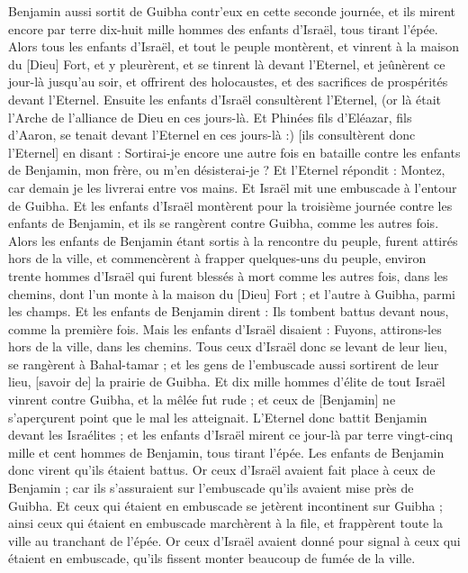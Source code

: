 \begin{multicols}{2}
Benjamin aussi sortit de Guibha contr'eux en cette seconde journée, et ils mirent encore par terre dix-huit mille hommes des enfants d'Israël, tous tirant l'épée.
Alors tous les enfants d'Israël, et tout le peuple montèrent, et vinrent à la maison du [Dieu] Fort, et y pleurèrent, et se tinrent là devant l'Eternel, et jeûnèrent ce jour-là jusqu'au soir, et offrirent des holocaustes, et des sacrifices de prospérités devant l'Eternel.
Ensuite les enfants d'Israël consultèrent l'Eternel, (or là était l'Arche de l'alliance de Dieu en ces jours-là.
Et Phinées fils d'Eléazar, fils d'Aaron, se tenait devant l'Eternel en ces jours-là :) [ils consultèrent donc l'Eternel] en disant : Sortirai-je encore une autre fois en bataille contre les enfants de Benjamin, mon frère, ou m'en désisterai-je ? Et l'Eternel répondit : Montez, car demain je les livrerai entre vos mains.
Et Israël mit une embuscade à l'entour de Guibha.
Et les enfants d'Israël montèrent pour la troisième journée contre les enfants de Benjamin, et ils se rangèrent contre Guibha, comme les autres fois.
Alors les enfants de Benjamin étant sortis à la rencontre du peuple, furent attirés hors de la ville, et commencèrent à frapper quelques-uns du peuple, environ trente hommes d'Israël qui furent blessés à mort comme les autres fois, dans les chemins, dont l'un monte à la maison du [Dieu] Fort ; et l'autre à Guibha, parmi les champs.
Et les enfants de Benjamin dirent : Ils tombent battus devant nous, comme la première fois. Mais les enfants d'Israël disaient : Fuyons, attirons-les hors de la ville, dans les chemins.
Tous ceux d'Israël donc se levant de leur lieu, se rangèrent à Bahal-tamar ; et les gens de l'embuscade aussi sortirent de leur lieu, [savoir de] la prairie de Guibha.
Et dix mille hommes d'élite de tout Israël vinrent contre Guibha, et la mêlée fut rude ; et ceux de [Benjamin] ne s'aperçurent point que le mal les atteignait.
L'Eternel donc battit Benjamin devant les Israélites ; et les enfants d'Israël mirent ce jour-là par terre vingt-cinq mille et cent hommes de Benjamin, tous tirant l'épée.
Les enfants de Benjamin donc virent qu'ils étaient battus. Or ceux d'Israël avaient fait place à ceux de Benjamin ; car ils s'assuraient sur l'embuscade qu'ils avaient mise près de Guibha.
Et ceux qui étaient en embuscade se jetèrent incontinent sur Guibha ; ainsi ceux qui étaient en embuscade marchèrent à la file, et frappèrent toute la ville au tranchant de l'épée.
Or ceux d'Israël avaient donné pour signal à ceux qui étaient en embuscade, qu'ils fissent monter beaucoup de fumée de la ville.

\end{multicols}
